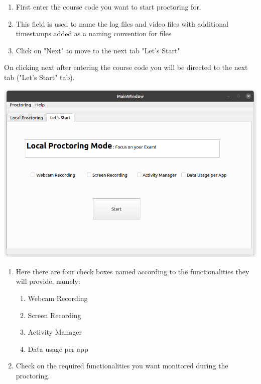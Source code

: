 \documentclass{article}
\begin{document}
\begin{enumerate}
    \item First enter the course code you want to start proctoring for.
    \item This field is used to name the log files and video files with additional timestamps added as a naming convention for files
    \item Click on "Next" to move to the next tab "Let's Start"
    
\end{enumerate}
On clicking next after entering the course code you will be directed to the next tab ("Let's Start" tab).
\begin{center}
\includegraphics[scale=0.5]{LetsStart.png}    
\end{center}

\begin{enumerate}
    \item Here there are four check boxes named according to the functionalities they will provide, namely:
    \begin{enumerate}
        \item Webcam Recording
        \item Screen Recording
        \item Activity Manager
        \item Data usage per app
    \end{enumerate}
    \item Check on the required functionalities you want monitored during the proctoring.
\end{enumerate}
\end{document}
